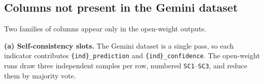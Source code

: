 \documentclass[11pt, a4paper]{article}
\begin{document}

\subsection{Columns not present in the Gemini dataset}
\label{sec:ow-columns}

Two families of columns appear only in the open-weight outputs.

\textbf{(a) Self-consistency slots.} The Gemini dataset is a single pass, so each
indicator contributes \texttt{\{ind\}\_\allowbreak prediction} and
\texttt{\{ind\}\_\allowbreak confidence}. The open-weight runs draw three
independent samples per row, numbered \texttt{SC1}--\texttt{SC3}, and reduce them by
majority vote.
\end{document}
